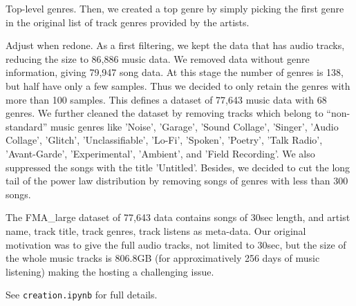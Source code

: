 \documentclass{article}
\newcommand{\todo}[1]{{\color{red} #1 }}
\begin{document}
\todo{Top-level genres.} Then, we created a top genre by simply picking the first genre in the original list of track genres provided by the artists.


\todo{Adjust when redone.}
As a first filtering, we kept the data that has audio tracks, reducing the size to 86,886 music data. 
We removed data without genre information, giving 79,947 song data.
At this stage the number of genres is 138, but half have only a few samples. Thus we decided to only retain the genres with more than 100 samples. This defines a dataset of 77,643 music data with 68 genres. We further cleaned the dataset by removing tracks which belong to ``non-standard'' music genres like 'Noise', 'Garage', 'Sound Collage', 'Singer', 'Audio Collage', 'Glitch', 'Unclassifiable', 'Lo-Fi', 'Spoken', 'Poetry', 'Talk Radio', 'Avant-Garde', 'Experimental', 'Ambient', and 'Field Recording'. We also suppressed the songs with the title 'Untitled'. Besides, we decided to cut the long tail of the power law distribution by removing songs of genres with less than 300 songs.

The FMA\_large dataset of 77,643 data contains songs of 30sec length, and artist name, track title, track genres, track listens as meta-data. Our original motivation was to give the full audio tracks, not limited to 30sec, but the size of the whole music tracks is 806.8GB (for approximatively 256 days of music listening) making the hosting a challenging issue.

See \texttt{creation.ipynb} for full details.
\end{document}
